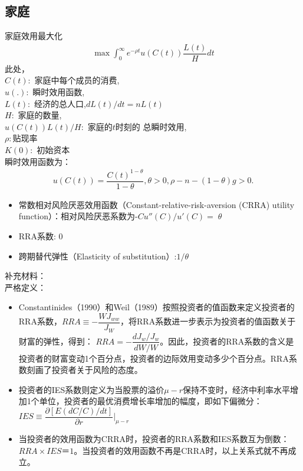 \subsection{家庭} 

家庭效用最大化
\begin{gather}
	\max\int_{0}^{\infty}e^{-\rho t}u\left(C(t)\right)\dfrac{L(t)}{H}dt
\end{gather}
此处，\\
$ C(t): $ 家庭中每个成员的消费,\\
$ u(.): $ 瞬时效用函数,\\
$ L(t): $ 经济的总人口,$  dL(t)/dt = nL(t) $\\
$ H: $ 家庭的数量,\\
$ u(C(t))L(t)/H: $ 家庭的$t $时刻的 总瞬时效用,\\
$ \rho:  $贴现率\\
$ K(0): $ 初始资本\\


\noindent 瞬时效用函数为：
\begin{gather}
	u\left(C(t)\right)
	=\dfrac{C(t)^{1-\theta}}{1-\theta},\theta>0,
	\rho-n-(1-\theta)g>0.
\end{gather}


\begin{itemize}
\item 常数相对风险厌恶效用函数（Constant-relative-risk-aversion (CRRA) utility function）：相对风险厌恶系数为-$ Cu''(C)/u'(C)=\theta $
\item RRA系数: 0
\item 跨期替代弹性（Elasticity of substitution）:$ 1/\theta $
	
\end{itemize}




补充材料：\\
严格定义：\\
\begin{itemize}
	\item Constantinides（1990）和Weil（1989）按照投资者的值函数来定义投资者的RRA系数，$ RRA\equiv -\dfrac{WJ_{ww}}{J_{W}} $，将RRA系数进一步表示为投资者的值函数关于财富的弹性，得到：
	$ RRA=-\dfrac{dJ_w/J_w}{dW/W} $。因此，投资者的RRA系数的含义是投资者的财富变动1个百分点，投资者的边际效用变动多少个百分点。RRA系数刻画了投资者关于风险的态度。
	\item 投资者的IES系数则定义为当股票的溢价$ \mu-r $保持不变时，经济中利率水平增加1个单位，投资者的最优消费增长率增加的幅度，即如下偏微分：
	$ IES \equiv \dfrac{\partial [E(dC/C)/dt]}{\partial r}|_{\mu-r}$
	\item 当投资者的效用函数为CRRA时，投资者的RRA系数和IES系数互为倒数：$ RRA\times IES＝1 $。当投资者的效用函数不再是CRRA时，以上关系式就不再成立。
\end{itemize}


